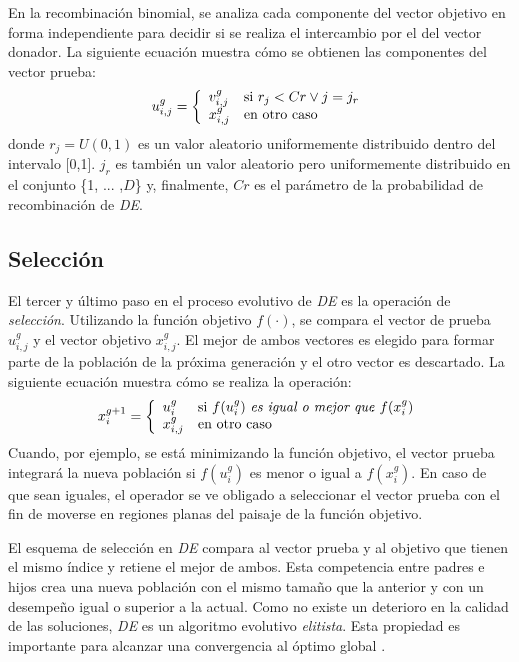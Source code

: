En la recombinación binomial, se analiza cada componente del vector objetivo en forma independiente para decidir si se realiza el intercambio por el del vector donador. La siguiente ecuación muestra cómo se obtienen las componentes del vector prueba:
\begin{equation}
u_{i,j}^g = \left\lbrace
\begin{array}{ll}
v_{i,j}^g & \textup{si } r_j < Cr \vee j = j_r\\
x_{i,j}^g & \textup{en otro caso} 
\end{array}
\right.
\end{equation}
donde $r_j=U(0, 1)$ es un valor aleatorio uniformemente distribuido dentro del intervalo [0,1]. $j_r$ es también un valor aleatorio pero uniformemente distribuido en el conjunto \{1, ... ,$D$\} y, finalmente, $Cr$ es el parámetro de la probabilidad de recombinación de \textit{DE}.


\subsection{Selección}


El tercer y último paso en el proceso evolutivo de \textit{DE} es la operación de \textit{selección}. Utilizando la función objetivo $f(\cdot)$, se compara el vector de prueba $u_{i,j}^g$ y el vector objetivo $x_{i,j}^g$. El mejor de ambos vectores es elegido para formar parte de la población de la próxima generación y el otro vector es descartado. La siguiente ecuación muestra cómo se realiza la operación:
\begin{equation}
x_{i}^{g+1} = \left\lbrace
\begin{array}{ll}
u_{i}^g & \textup{si } f(u_{i}^g) \textup{ \textit{es igual o mejor que} } f(x_{i}^g)\\
x_{i,j}^g & \textup{en otro caso} 
\end{array}
\right.
\end{equation}
Cuando, por ejemplo, se está minimizando la función objetivo, el vector prueba integrará la nueva población si $f(u_{i}^g)$ es menor o igual a $f(x_{i}^g)$. En caso de que sean iguales, el operador se ve obligado a seleccionar el vector prueba con el fin de moverse en regiones planas del paisaje de la función objetivo.


El esquema de selección en \textit{DE} compara al vector prueba y al objetivo que tienen el mismo índice y retiene el mejor de ambos. Esta competencia entre padres e hijos crea una nueva población con el mismo tamaño que la anterior y con un desempeño igual o superior a la actual. Como no existe un deterioro en la calidad de las soluciones, \textit{DE} es un algoritmo evolutivo \textit{elitista}. Esta propiedad es importante para alcanzar una convergencia al óptimo global \cite{Rudolph}. 


